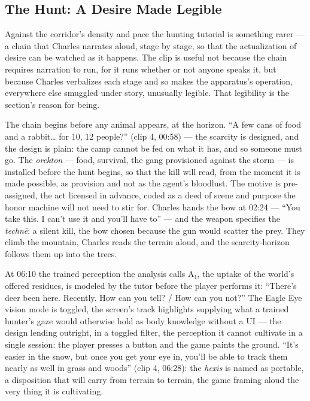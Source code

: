 \bigskip

\subsection*{The Hunt: A Desire Made Legible}

Against the corridor's density and pace the hunting tutorial is something rarer — a chain that Charles narrates aloud, stage by stage, so that the actualization of desire can be watched as it happens. The clip is useful not because the chain requires narration to run, for it runs whether or not anyone speaks it, but because Charles verbalizes each stage and so makes the apparatus's operation, everywhere else smuggled under story, unusually legible. That legibility is the section's reason for being.

The chain begins before any animal appears, at the horizon. ``A few cans of food and a rabbit… for 10, 12 people?'' (clip 4, 00:58) — the scarcity is designed, and the design is plain: the camp cannot be fed on what it has, and so someone must go. The \textit{orekton} — food, survival, the gang provisioned against the storm — is installed before the hunt begins, so that the kill will read, from the moment it is made possible, as provision and not as the agent's bloodlust. The motive is pre-assigned, the act licensed in advance, coded as a deed of scene and purpose the honor machine will not need to stir for. Charles hands the bow at 02:24 — ``You take this. I can't use it and you'll have to'' — and the weapon specifies the \textit{technē}: a silent kill, the bow chosen because the gun would scatter the prey. They climb the mountain, Charles reads the terrain aloud, and the scarcity-horizon follows them up into the trees.

At 06:10 the trained perception the analysis calls A₁, the uptake of the world's offered residues, is modeled by the tutor before the player performs it: ``There's deer been here. Recently. How can you tell? / How can you not?'' The Eagle Eye vision mode is toggled, the screen's track highlights supplying what a trained hunter's gaze would otherwise hold as body knowledge without a UI — the design lending outright, in a toggled filter, the perception it cannot cultivate in a single session: the player presses a button and the game paints the ground. ``It's easier in the snow, but once you get your eye in, you'll be able to track them nearly as well in grass and woods'' (clip 4, 06:28): the \textit{hexis} is named as portable, a disposition that will carry from terrain to terrain, the game framing aloud the very thing it is cultivating.

